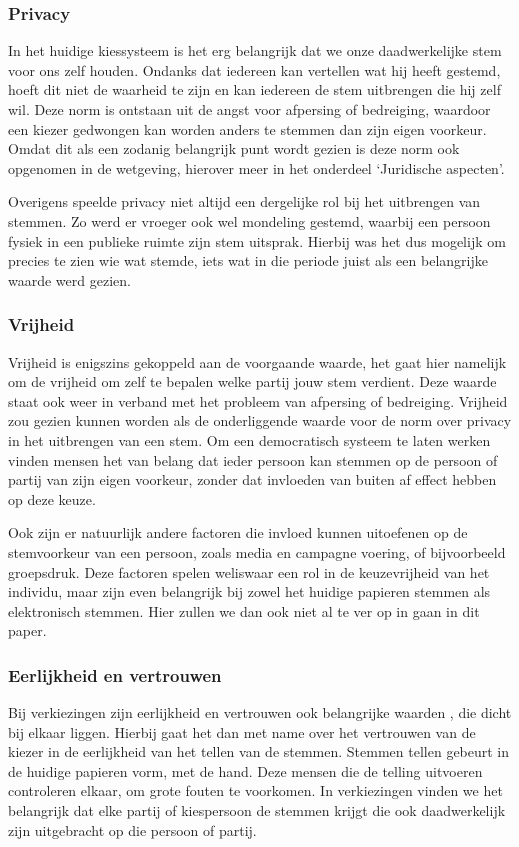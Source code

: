 \documentclass[a4paper]{article}
\begin{document}
\subsubsection{Privacy}
In het huidige kiessysteem is het erg belangrijk dat we onze daadwerkelijke stem voor ons zelf houden.
Ondanks dat iedereen kan vertellen wat hij heeft gestemd, hoeft dit niet de waarheid te zijn en kan iedereen de stem uitbrengen die hij zelf wil.
Deze norm is ontstaan uit de angst voor afpersing of bedreiging, waardoor een kiezer gedwongen kan worden anders te stemmen dan zijn eigen voorkeur.
Omdat dit als een zodanig belangrijk punt wordt gezien is deze norm ook opgenomen in de wetgeving, hierover meer in het onderdeel `Juridische aspecten'.

Overigens speelde privacy niet altijd een dergelijke rol bij het uitbrengen van stemmen.
Zo werd er vroeger ook wel mondeling gestemd, waarbij een persoon fysiek in een publieke ruimte zijn stem uitsprak.
Hierbij was het dus mogelijk om precies te zien wie wat stemde, iets wat in die periode juist als een belangrijke waarde werd gezien.

\subsubsection{Vrijheid}
Vrijheid is enigszins gekoppeld aan de voorgaande waarde, het gaat hier namelijk om de vrijheid om zelf te bepalen welke partij jouw stem verdient.
Deze waarde staat ook weer in verband met het probleem van afpersing of bedreiging.
Vrijheid zou gezien kunnen worden als de onderliggende waarde voor de norm over privacy in het uitbrengen van een stem.
Om een democratisch systeem te laten werken vinden mensen het van belang dat ieder persoon kan stemmen op de persoon of partij van zijn eigen voorkeur, zonder dat invloeden van buiten af effect hebben op deze keuze.

Ook zijn er natuurlijk andere factoren die invloed kunnen uitoefenen op de stemvoorkeur van een persoon, zoals media en campagne voering, of bijvoorbeeld groepsdruk.
Deze factoren spelen weliswaar een rol in de keuzevrijheid van het individu, maar zijn even belangrijk bij zowel het huidige papieren stemmen als elektronisch stemmen.
Hier zullen we dan ook niet al te ver op in gaan in dit paper.

\subsubsection{Eerlijkheid en vertrouwen}
Bij verkiezingen zijn eerlijkheid en vertrouwen ook belangrijke waarden , die dicht bij elkaar liggen.
Hierbij gaat het dan met name over het vertrouwen van de kiezer in de eerlijkheid van het tellen van de stemmen.
Stemmen tellen gebeurt in de huidige papieren vorm, met de hand.
Deze mensen die de telling uitvoeren controleren elkaar, om grote fouten te voorkomen.
In verkiezingen vinden we het belangrijk dat elke partij of kiespersoon de stemmen krijgt die ook daadwerkelijk zijn uitgebracht op die persoon of partij.
\end{document}
